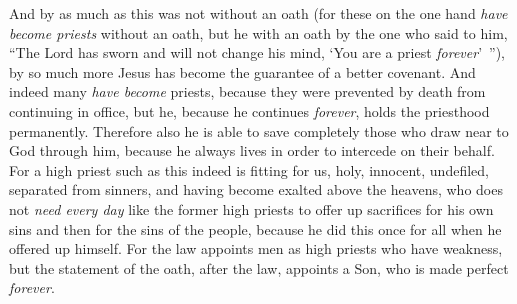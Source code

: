 \begin{biblechapter}
\verse And by as much as this was not without an oath (for these on the one hand \textit{have become priests} without an oath,
\verse but he with an oath by the one who said to him, “The Lord has sworn and will not change his mind, 
‘You are a priest \textit{forever}’ ”),
\verse by so much more Jesus has become the guarantee of a better covenant.
\verse And indeed many \textit{have become} priests, because they were prevented by death from continuing in office,
\verse but he, because he continues \textit{forever}, holds the priesthood permanently.
\verse Therefore also he is able to save completely those who draw near to God through him, because he always lives in order to intercede on their behalf.
\verse For a high priest such as this indeed is fitting for us, holy, innocent, undefiled, separated from sinners, and having become exalted above the heavens,
\verse who does not \textit{need every day} like the former high priests to offer up sacrifices for his own sins and then for the sins of the people, because he did this once for all when he offered up himself.
\verse For the law appoints men as high priests who have weakness, but the statement of the oath, after the law, appoints a Son, who is made perfect \textit{forever}.
\end{biblechapter}

